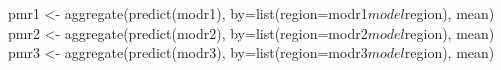 \begin{Schunk}
\begin{Sinput}
 pmr1 <- aggregate(predict(modr1), by=list(region=modr1$model$region), mean)
 pmr2 <- aggregate(predict(modr2), by=list(region=modr2$model$region), mean)
 pmr3 <- aggregate(predict(modr3), by=list(region=modr3$model$region), mean)
\end{Sinput}
\end{Schunk}
